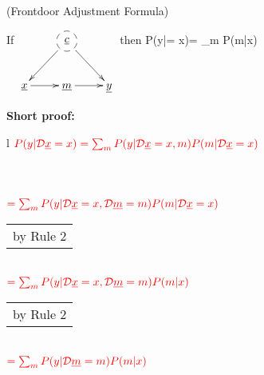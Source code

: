 \begin{claim} (Frontdoor
Adjustment Formula)
\label{cl-frontdoor-proof}

If
$
\xymatrix{
&*++[F-o]{\rvc}\ar[ld]\ar[rd]
\\
\rvx\ar[r]&\rvm\ar[r]&\rvy
}$
then
\beq
P(y|\cald \rvx = x)=
\sum_m
P(m|x)
\eeq

\beq
{}
\eeq
\end{claim}

\proof


{\bf * Short proof:}
\\
\begin{longtable}{l}
$\color{red}
P(y|{\cal D}{\underline{x}}=x)=
\sum_m
P(y|{\cal D}{\underline{x}}=x, m)
P(m|{\cal D}{\underline{x}}=x)$
\\
\\
\xymatrix{\\=}
\\
\\
$\color{red}=
\sum_m
P(y|{\cal D}{\underline{x}}=x, {\cal D}{\underline{m}}=m)
P(m|{\cal D}{\underline{x}}=x)$
\\
\begin{tabular}{l}
\\
by Rule 2
\end{tabular}
\\
$\color{red}=
\sum_m
P(y|{\cal D}{\underline{x}}=x, {\cal D}{\underline{m}}=m)
P(m| x)$
\\
\begin{tabular}{l}
\\
by Rule 2
\end{tabular}
\\
$\color{red}=
\sum_m
P(y|{\cal D}{\underline{m}}=m)
P(m|x)$
\\
\begin{tabular}{l}

\end{tabular}
\end{longtable}
